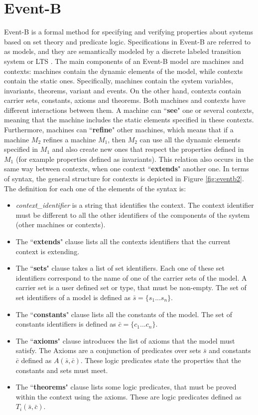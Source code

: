 \section{Event-B}
Event-B \cite{Abrial2011,Butler2013} is a formal method for specifying and verifying properties about systems based on set theory and predicate logic. Specifications in Event-B are referred to as models, and they are semantically modeled by a discrete labeled transition system or LTS \cite{LTS}. The main components of an Event-B model are machines and contexts: machines contain the dynamic elements of the model, while contexts contain the static ones. Specifically, machines contain the system variables, invariants, theorems, variant and events. On the other hand, contexts contain carrier sets, constants, axioms and theorems. Both machines and contexts have different interactions between them. A machine can ``\textbf{see}" one or several contexts, meaning that the machine includes the static elements specified in these contexts. Furthermore, machines can ``\textbf{refine}" other machines, which means that if a machine $M_2$ refines a machine $M_1$, then $M_2$ can use all the dynamic elements specified in $M_1$ and also create new ones that respect the properties defined in $M_1$ (for example properties defined as invariants). This relation also occurs in the same way between contexts, when one context ``\textbf{extends}" another one.
In terms of syntax, the general structure for contexts is depicted in Figure \ref{fig:eventb2}. The definition for each one of the elements of the syntax is:
\begin{itemize}
    \item \textit{context\_identifier} is a string that identifies the context. The context identifier must be different to all the other identifiers of the components of the system (other machines or contexts).
    \item The ``\textbf{extends}" clause lists all the contexts identifiers that the current context is extending.
    \item The ``\textbf{sets}" clause takes a list of set identifiers. Each one of these set identifiers correspond to the name of one of the carrier sets of the model. A carrier set is a user defined set or type, that must be non-empty. The set of set identifiers of a model is defined as $\bar{s} = \{s_1...s_n\}$. 
    \item The ``\textbf{constants}" clause lists all the constants of the model. The set of constants identifiers is defined as $\bar{c} = \{c_1...c_n\}$.
    \item The ``\textbf{axioms}" clause introduces the list of axioms that the model must satisfy. The Axioms are a conjunction of predicates over sets $\bar{s}$ and constants $\bar{c}$ defined as $A(\bar{s},\bar{c})$. These logic predicates state the properties that the constants and sets must meet.
    \item The ``\textbf{theorems}" clause lists some logic predicates, that must be proved within the context using the axioms. These are logic predicates defined as $T_i(\bar{s},\bar{c})$.
\end{itemize}
